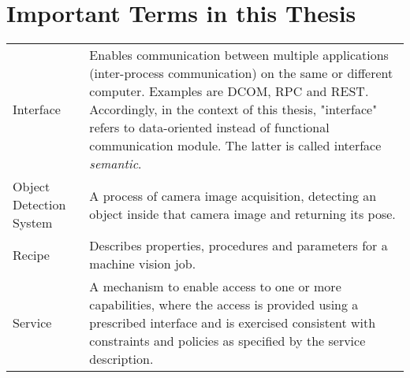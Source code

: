 \chapter*{Important Terms in this Thesis}

\extrarowsep=0.6cm\begin{tabu} to \linewidth{lX}
    Interface & Enables communication between multiple applications (inter-process communication) on the same or different computer. Examples are DCOM, RPC and REST. Accordingly, in the context of this thesis, "interface" refers to data-oriented instead of functional communication module. The latter is called interface \textit{semantic}.\\ 
    Object Detection System & A process of camera image acquisition, detecting an object inside that camera image and returning its pose.\\
    Recipe &  	Describes properties, procedures and parameters for a machine vision job. \cite{VDMA2018OPC40100-1:2018-11}	 \\ 
    Service & A mechanism to enable access to one or more capabilities, where the access is provided using a prescribed interface and is exercised consistent with constraints and policies as specified by the service description. \cite{MacKenzie2006ReferenceStandard}
\end{tabu}

